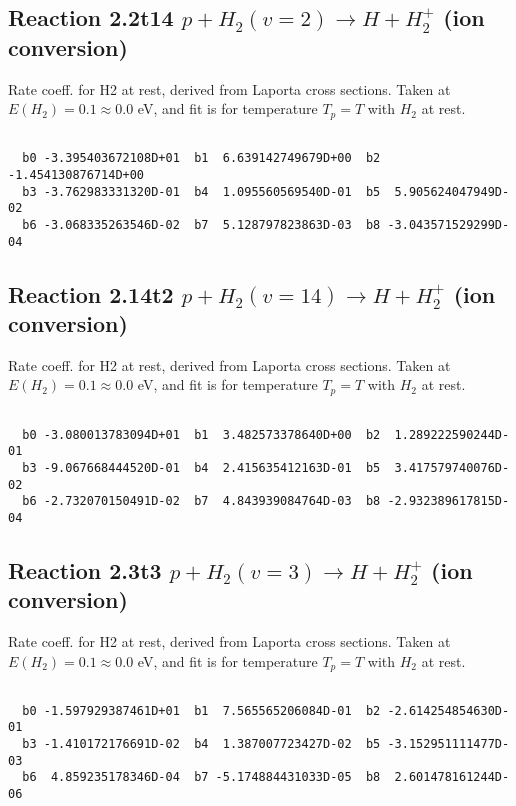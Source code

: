 \documentclass[12pt,dvipdfmx]{article}
\begin{document}
\newpage
\subsection{
Reaction 2.2t14
$ p + H_2(v=2) \rightarrow H + H_2^+$ (ion conversion)
}
Rate coeff. for H2 at rest, derived from Laporta cross sections.
Taken at $E(H_2) = 0.1 \approx 0.0$ eV,  and fit is for temperature $T_p=T$ with $H_2$ at rest.

\begin{small}\begin{verbatim}

  b0 -3.395403672108D+01  b1  6.639142749679D+00  b2 -1.454130876714D+00
  b3 -3.762983331320D-01  b4  1.095560569540D-01  b5  5.905624047949D-02
  b6 -3.068335263546D-02  b7  5.128797823863D-03  b8 -3.043571529299D-04

\end{verbatim}\end{small}

\newpage
\subsection{
Reaction 2.14t2
$ p + H_2(v=14) \rightarrow H + H_2^+$ (ion conversion)
}
Rate coeff. for H2 at rest, derived from Laporta cross sections.
Taken at $E(H_2) = 0.1 \approx 0.0$ eV,  and fit is for temperature $T_p=T$ with $H_2$ at rest.

\begin{small}\begin{verbatim}

  b0 -3.080013783094D+01  b1  3.482573378640D+00  b2  1.289222590244D-01
  b3 -9.067668444520D-01  b4  2.415635412163D-01  b5  3.417579740076D-02
  b6 -2.732070150491D-02  b7  4.843939084764D-03  b8 -2.932389617815D-04

\end{verbatim}\end{small}

\newpage
\subsection{
Reaction 2.3t3
$ p + H_2(v=3) \rightarrow H + H_2^+$ (ion conversion)
}
Rate coeff. for H2 at rest, derived from Laporta cross sections.
Taken at $E(H_2) = 0.1 \approx 0.0$ eV,  and fit is for temperature $T_p=T$ with $H_2$ at rest.

\begin{small}\begin{verbatim}

  b0 -1.597929387461D+01  b1  7.565565206084D-01  b2 -2.614254854630D-01
  b3 -1.410172176691D-02  b4  1.387007723427D-02  b5 -3.152951111477D-03
  b6  4.859235178346D-04  b7 -5.174884431033D-05  b8  2.601478161244D-06

\end{verbatim}\end{small}
\end{document}
